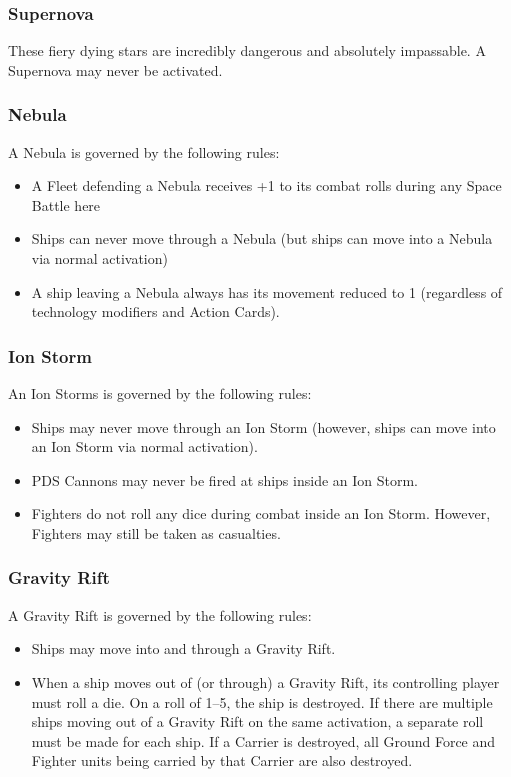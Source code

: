 \documentclass[11pt,fleqn]{book} %
\begin{document}
\subsubsection{Supernova} 
These fiery dying stars are incredibly dangerous and absolutely impassable. A Supernova may never be activated.

\subsubsection{Nebula} 
A Nebula is governed by the following rules:
\begin{itemize}
	\item A Fleet defending a Nebula receives +1 to its combat rolls during any Space Battle here
	\item Ships can never move through a Nebula (but ships can move into a Nebula via normal activation)
	\item A ship leaving a Nebula always has its movement reduced to 1 (regardless of technology modifiers and Action Cards).
\end{itemize}

\begin{SEbox}
\subsubsection{Ion Storm} 
An Ion Storms is governed by the following rules:
\begin{itemize}
	\item Ships may never move through an Ion Storm (however, ships can move into an Ion Storm via normal activation).
	\item PDS Cannons may never be fired at ships inside an Ion Storm.
	\item Fighters do not roll any dice during combat inside an Ion Storm. 
	However, Fighters may still be taken as casualties.
\end{itemize}
\end{SEbox}
\begin{STbox}
\subsubsection{Gravity Rift} 
A Gravity Rift is governed by the following rules:
\begin{itemize}
    \item Ships may move into and through a Gravity Rift.
	\item When a ship moves out of (or through) a Gravity Rift, its controlling player must roll a die. 
	On a roll of 1–5, the ship is destroyed. 
	If there are multiple ships moving out of a Gravity Rift on the same activation, a separate roll must be made for each ship. 
	If a Carrier is destroyed, all Ground Force and Fighter units being carried by that Carrier are also destroyed.
\end{itemize}
\end{STbox}
\end{document}
